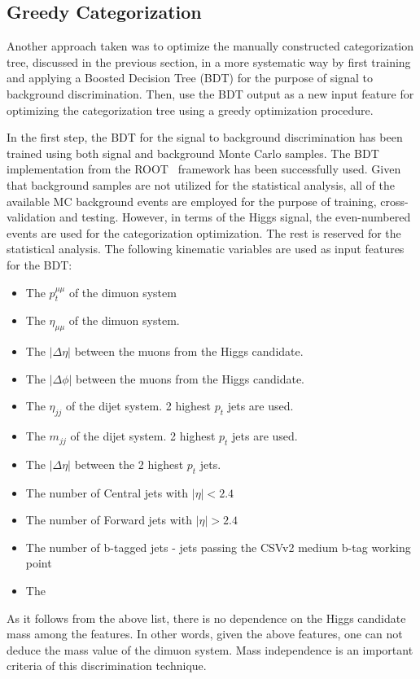\subsection{Greedy Categorization} \label{bdt_training}
Another approach taken was to optimize the manually constructed categorization tree, discussed in the previous section, in a more systematic way by first training and applying a Boosted Decision Tree (BDT) for the purpose of signal to background discrimination. Then, use the BDT output as a new input feature for optimizing the categorization tree using a greedy optimization procedure.

In the first step, the BDT for the signal to background discrimination has been trained using both signal and background Monte Carlo samples. The BDT implementation from the {\sc ROOT}~\cite{ROOT} framework has been successfully used. Given that background samples are not utilized for the statistical analysis, all of the available MC background events are employed for the purpose of training, cross-validation and testing. However, in terms of the Higgs signal, the even-numbered events are used for the categorization optimization. The rest is reserved for the statistical analysis. The following kinematic variables are used as input features for the BDT:
\begin{itemize}
  \item The $p_t^{\mu\mu}$ of the dimuon system
  \item The $\eta_{\mu\mu}$ of the dimuon system.
  \item The $|\Delta \eta|$ between the muons from the Higgs candidate.
  \item The $|\Delta \phi|$ between the muons from the Higgs candidate.
  \item The $\eta_{jj}$ of the dijet system. 2 highest $p_t$ jets are used.
  \item The $m_{jj}$ of the dijet system. 2 highest $p_t$ jets are used.
  \item The $|\Delta \eta|$ between the 2 highest $p_t$ jets.
  \item The number of Central jets with $|\eta| < 2.4$
  \item The number of Forward jets with $|\eta| > 2.4$
  \item The number of b-tagged jets - jets passing the CSVv2 medium b-tag working point
  \item The \MET
\end{itemize}
As it follows from the above list, there is no dependence on the Higgs candidate mass among the features. In other words, given the above features, one can not deduce the mass value of the dimuon system. Mass independence is an important criteria of this discrimination technique.

